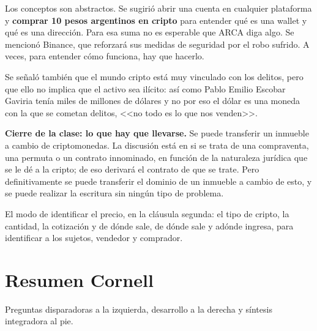 \documentclass[12pt,oneside,a4paper]{book}
\begin{document}
Los conceptos son abstractos. Se sugirió abrir una cuenta en cualquier plataforma y \textbf{comprar 10 pesos argentinos en cripto} para entender qué es una wallet y qué es una dirección. Para esa suma no es esperable que ARCA diga algo. Se mencionó Binance, que reforzará sus medidas de seguridad por el robo sufrido. A veces, para entender cómo funciona, hay que hacerlo.

Se señaló también que el mundo cripto está muy vinculado con los delitos, pero que ello no implica que el activo sea ilícito: así como Pablo Emilio Escobar Gaviria tenía miles de millones de dólares y no por eso el dólar es una moneda con la que se cometan delitos, <<no todo es lo que nos venden>>.

\begin{important}
\textbf{Cierre de la clase: lo que hay que llevarse.} Se puede transferir un inmueble a cambio de criptomonedas. La discusión está en si se trata de una compraventa, una permuta o un contrato innominado, en función de la naturaleza jurídica que se le dé a la cripto; de eso derivará el contrato de que se trate. Pero definitivamente se puede transferir el dominio de un inmueble a cambio de esto, y se puede realizar la escritura sin ningún tipo de problema.

El modo de identificar el precio, en la cláusula segunda: el tipo de cripto, la cantidad, la cotización y de dónde sale, de dónde sale y adónde ingresa, para identificar a los sujetos, vendedor y comprador.
\end{important}

\clearpage
\chapter*{Resumen Cornell}

Preguntas disparadoras a la izquierda, desarrollo a la derecha y síntesis integradora al pie.
\end{document}
